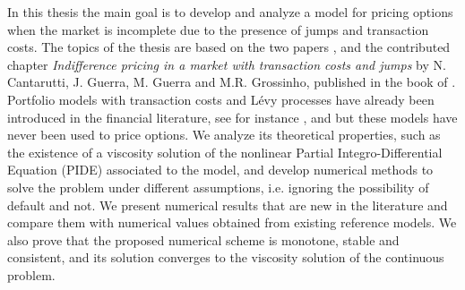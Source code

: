 In this thesis the main goal is to develop and analyze a model for pricing options when the market is incomplete due to the presence of jumps and transaction costs. 
The topics of the thesis are based on the two papers 
\cite{Canta2}, \cite{Canta} and the contributed chapter \emph{Indifference pricing in a market with transaction costs and jumps} by N. Cantarutti, J. Guerra, M. Guerra and 
M.R. Grossinho, published in the book of \cite{Matthias}.\\
Portfolio models with transaction costs and Lévy processes have already been introduced in the financial literature, see for instance \cite{OkSu01}, \cite{BKR01} and \cite{Kab16} 
but these models have never been used to price options.  
We analyze its theoretical properties, such as the existence of a viscosity solution  
of the nonlinear 
Partial Integro-Differential Equation (PIDE) associated to the model, and develop numerical methods to solve the problem under different assumptions, i.e. ignoring the 
possibility of default and not.
We present numerical results that are new in the literature and compare them with numerical values obtained from existing reference models. We also prove that 
the proposed numerical scheme is monotone, stable and consistent, and its solution converges to the viscosity solution of the continuous problem.

